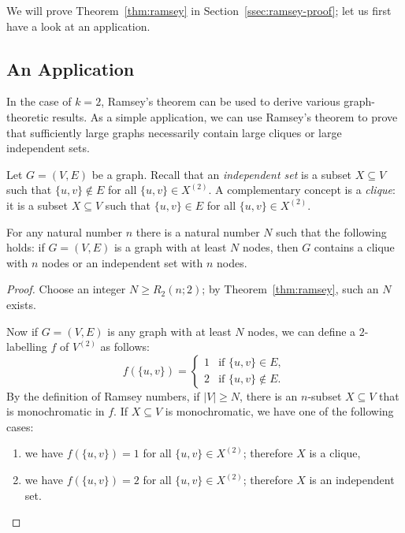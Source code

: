 We will prove Theorem~\ref{thm:ramsey} in Section~\ref{ssec:ramsey-proof}; let us first have a look at an application.


\subsection{An Application}

In the case of $k = 2$, Ramsey's theorem can be used to derive various graph-theoretic results. As a simple application, we can use Ramsey's theorem to prove that sufficiently large graphs necessarily contain large cliques or large independent sets.

Let $G = (V,E)$ be a graph. Recall that an \emph{independent set} is a subset $X \subseteq V$ such that $\{u,v\} \notin E$ for all $\{u, v\} \in X^{(2)}$. A complementary concept is a \emph{clique}: it is a subset $X \subseteq V$ such that $\{u,v\} \in E$ for all $\{u, v\} \in X^{(2)}$.

\begin{lemma}
    For any natural number $n$ there is a natural number $N$ such that the following holds:
    if $G = (V,E)$ is a graph with at least $N$ nodes,
    then $G$ contains a clique with $n$ nodes or an independent set with $n$ nodes.
\end{lemma}
\begin{proof}
    Choose an integer $N \ge R_2(n;2)$; by Theorem~\ref{thm:ramsey}, such an $N$ exists.
    
    Now if $G = (V,E)$ is any graph with at least $N$ nodes, we can define a $2$-labelling $f$ of $V^{(2)}$ as follows:
    \[
        f(\{u,v\}) = \begin{cases}
            1 & \text{if } \{u,v\} \in E, \\
            2 & \text{if } \{u,v\} \notin E.
        \end{cases}
    \]
    By the definition of Ramsey numbers, if $|V| \ge N$, there is an $n$-subset $X \subseteq V$ that is monochromatic in $f$.
    If $X \subseteq V$ is monochromatic, we have one of the following cases:
    \begin{enumerate}
        \item we have $f(\{u,v\}) = 1$ for all $\{u,v\} \in X^{(2)}$; therefore $X$ is a clique,
        \item we have $f(\{u,v\}) = 2$ for all $\{u,v\} \in X^{(2)}$; therefore $X$ is an independent set. \qedhere
    \end{enumerate}
\end{proof}


